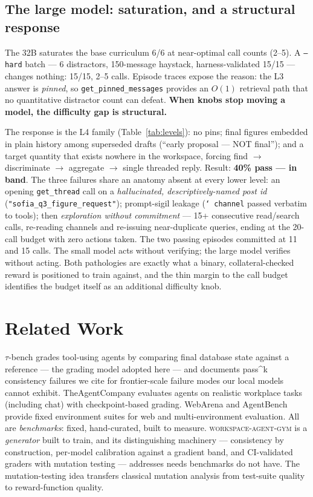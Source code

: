 \documentclass[10pt]{article}
\begin{document}
\subsection{The large model: saturation, and a structural response}
The 32B saturates the base curriculum 6/6 at near-optimal call counts (2--5). A \texttt{--hard} batch --- 6 distractors, 150-message haystack, harness-validated 15/15 --- changes nothing: 15/15, 2--5 calls. Episode traces expose the reason: the L3 answer is \emph{pinned}, so \texttt{get\_pinned\_messages} provides an $O(1)$ retrieval path that no quantitative distractor count can defeat. \textbf{When knobs stop moving a model, the difficulty gap is structural.}

The response is the L4 family (Table~\ref{tab:levels}): no pins; final figures embedded in plain history among superseded drafts (``early proposal --- NOT final''); and a target quantity that exists nowhere in the workspace, forcing find $\to$ discriminate $\to$ aggregate $\to$ single threaded reply. Result: \textbf{40\% pass --- in band}. The three failures share an anatomy absent at every lower level: an opening \texttt{get\_thread} call on a \emph{hallucinated, descriptively-named post id} (\texttt{"sofia\_q3\_figure\_request"}); prompt-sigil leakage (\texttt{\char`~channel} passed verbatim to tools); then \emph{exploration without commitment} --- 15+ consecutive read/search calls, re-reading channels and re-issuing near-duplicate queries, ending at the 20-call budget with zero actions taken. The two passing episodes committed at 11 and 15 calls. The small model acts without verifying; the large model verifies without acting. Both pathologies are exactly what a binary, collateral-checked reward is positioned to train against, and the thin margin to the call budget identifies the budget itself as an additional difficulty knob.

\section{Related Work}

$\tau$-bench \cite{yao2024tau} grades tool-using agents by comparing final database state against a reference --- the grading model adopted here --- and documents pass\textasciicircum{}k consistency failures we cite for frontier-scale failure modes our local models cannot exhibit. TheAgentCompany \cite{tac2024} evaluates agents on realistic workplace tasks (including chat) with checkpoint-based grading. WebArena \cite{zhou2023webarena} and AgentBench \cite{liu2023agentbench} provide fixed environment suites for web and multi-environment evaluation. All are \emph{benchmarks}: fixed, hand-curated, built to measure. \textsc{workspace-agent-gym} is a \emph{generator} built to train, and its distinguishing machinery --- consistency by construction, per-model calibration against a gradient band, and CI-validated graders with mutation testing --- addresses needs benchmarks do not have. The mutation-testing idea transfers classical mutation analysis from test-suite quality \cite{jia2011mutation} to reward-function quality.
\end{document}

